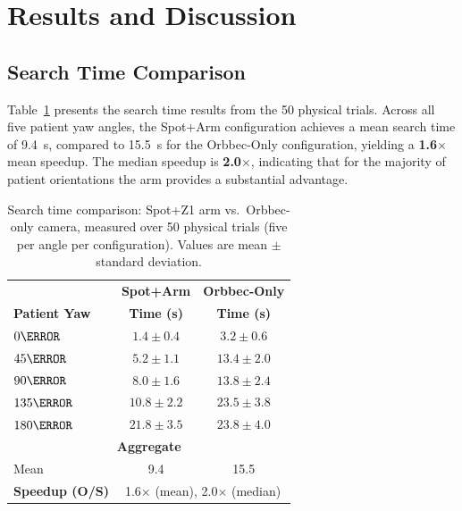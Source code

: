 \section{Results and Discussion}
\label{sec:results}

\subsection{Search Time Comparison}

Table~\ref{tab:search_time} presents the search time results from the 50
physical trials. Across all five patient yaw angles, the Spot+Arm
configuration achieves a mean search time of \SI{9.4}{\second}, compared to
\SI{15.5}{\second} for the Orbbec-Only configuration, yielding a
\textbf{1.6}$\times$ mean speedup. The median speedup is \textbf{2.0}$\times$,
indicating that for the majority of patient orientations the arm provides a
substantial advantage.

\begin{table}[htbp]
  \centering
  \caption{Search time comparison: Spot+Z1 arm vs.\ Orbbec-only camera,
           measured over 50 physical trials (five per angle per
           configuration).  Values are mean $\pm$ standard deviation.}
  \label{tab:search_time}
  \begin{tabular}{lcc}
    \toprule
    & \textbf{Spot+Arm} & \textbf{Orbbec-Only} \\
    \textbf{Patient Yaw} & \textbf{Time (s)} & \textbf{Time (s)} \\
    \midrule
    $0\degree$   & $1.4 \pm 0.4$  & $3.2 \pm 0.6$ \\
    $45\degree$  & $5.2 \pm 1.1$  & $13.4 \pm 2.0$ \\
    $90\degree$  & $8.0 \pm 1.6$  & $13.8 \pm 2.4$ \\
    $135\degree$ & $10.8 \pm 2.2$ & $23.5 \pm 3.8$ \\
    $180\degree$ & $21.8 \pm 3.5$ & $23.8 \pm 4.0$ \\
    \midrule
    \multicolumn{3}{c}{\textbf{Aggregate}} \\
    \midrule
    Mean & 9.4 & 15.5 \\
    \midrule
    \textbf{Speedup (O/S)} & \multicolumn{2}{c}{1.6$\times$ (mean), 2.0$\times$ (median)} \\
    \bottomrule
  \end{tabular}
\end{table}

